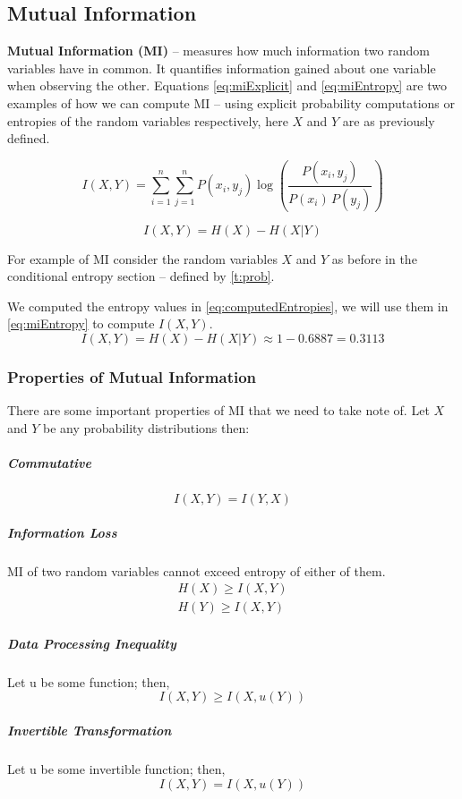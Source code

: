 \documentclass[dissertation.tex]{subfiles}
\begin{document}
\subsection{Mutual Information}
\textbf{Mutual Information (MI)} -- measures how much information two random
variables have in common. It quantifies information gained about one variable
when observing the other. Equations \ref{eq:miExplicit} and \ref{eq:miEntropy}
are two examples of how we can compute MI -- using explicit probability
computations or entropies of the random variables respectively, here $X$ and $Y$
are as previously defined.

\begin{equation}
      I(X,Y)=\sum _{i=1}^n\sum _{j=1}^n{P(x_i,y_j)\log {\left({\frac
      {P(x_i,y_j)}{P(x_i)\,P(y_j)}}\right)}} 
\label{eq:miExplicit}
\end{equation}

\begin{equation}
  I(X, Y) = H(X) - H(X|Y)
\label{eq:miEntropy}
\end{equation}

For example of MI consider the random variables $X$ and $Y$ as
before in the conditional entropy section -- defined by \autoref{t:prob}. 

We computed the entropy values in \autoref{eq:computedEntropies}, we will use
them in \autoref{eq:miEntropy} to compute $I(X,Y)$.
\begin{equation}
  I(X,Y) = H(X) - H(X|Y) \approx 1 - 0.6887 = 0.3113
\end{equation}

\subsubsection{Properties of Mutual Information}
There are some important properties of MI that we need to take note of. Let $X$
and $Y$ be any probability distributions then:

\subparagraph{Commutative} 
\begin{equation}
  I(X,Y) = I(Y, X)
\end{equation}
\subparagraph{Information Loss} MI of two random variables cannot exceed entropy
of either of them.
\begin{align}
  H(X) \geq I(X,Y) \nonumber \\
  H(Y) \geq I(X,Y)
  \label{eq:MIloss}
\end{align}
\subparagraph{Data Processing Inequality} Let u be some function; then,
\begin{equation}
  I(X,Y) \geq I(X, u(Y))
\end{equation}
\subparagraph{Invertible Transformation} Let u be some invertible function;
then,
\begin{equation}
  I(X, Y) = I(X, u(Y))
\end{equation}
\end{document}
